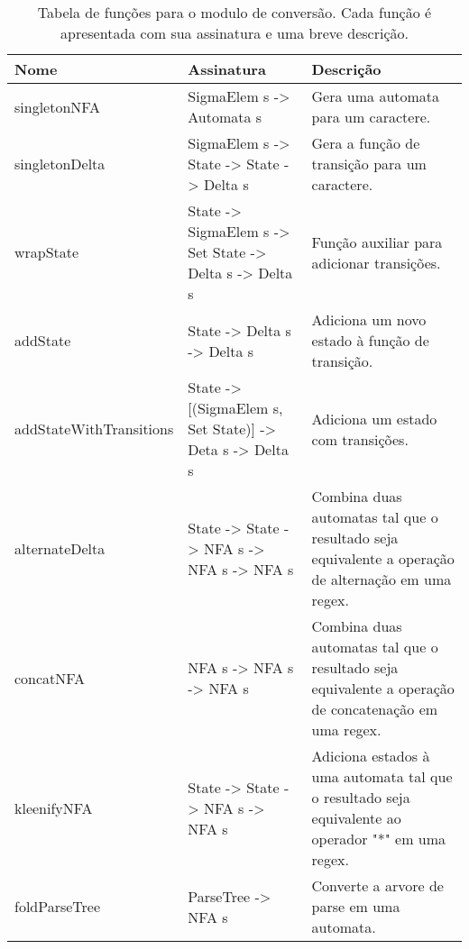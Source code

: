 \begin{table}
  \begin{tabular}{lll}
  \hline
  Nome & Assinatura & Descrição \\
  \hline
  singletonNFA & SigmaElem s -> Automata s & Gera uma automata para um caractere. \\
  singletonDelta & SigmaElem s -> State -> State -> Delta s & Gera a função de transição para um caractere. \\
  wrapState & State -> SigmaElem s -> Set State -> Delta s -> Delta s & Função auxiliar para adicionar transições. \\
  addState & State -> Delta s -> Delta s & Adiciona um novo estado à função de transição. \\
  addStateWithTransitions & State -> [(SigmaElem s, Set State)] -> Deta s -> Delta s & Adiciona um estado com transições. \\
  alternateDelta &  State -> State -> NFA s -> NFA s -> NFA s & Combina duas automatas tal que o resultado seja equivalente a operação de alternação em uma regex. \\
  concatNFA & NFA s -> NFA s -> NFA s & Combina duas automatas tal que o resultado seja equivalente a operação de concatenação em uma regex. \\
  kleenifyNFA & State -> State -> NFA s -> NFA s & Adiciona estados à uma automata tal que o resultado seja equivalente ao operador "*" em uma regex.\\
  foldParseTree & ParseTree -> NFA s & Converte a arvore de parse em uma automata.\\
 \hline
  \end{tabular}
\caption{Tabela de funções para o modulo de conversão. Cada função é apresentada com sua assinatura e uma breve descrição.}
\label{t-translator-funcs}
\end{table}
